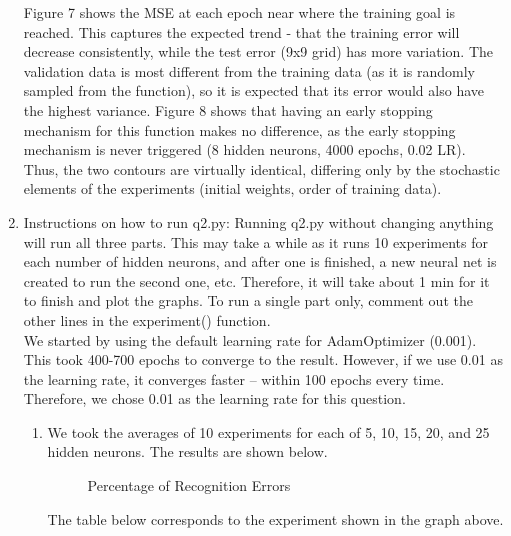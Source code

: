 \documentclass[11pt]{article}
\begin{document}
\begin{enumerate}
Figure 7 shows the MSE at each epoch near where the training goal is reached. This captures the expected trend - that the training error will decrease consistently, while the test error (9x9 grid) has more variation. The validation data is most different from the training data (as it is randomly sampled from the function), so it is expected that its error would also have the highest variance.\newline
\newline
Figure 8 shows that having an early stopping mechanism for this function makes no difference, as the early stopping mechanism is never triggered (8 hidden neurons, 4000 epochs, 0.02 LR). Thus, the two contours are virtually identical, differing only by the stochastic elements of the experiments (initial weights, order of training data). 

\pagebreak
\item Instructions on how to run q2.py:\newline
\newline
Running q2.py without changing anything will run all three parts. This may take a while as it runs 10 experiments for each number of hidden neurons, and after one is finished, a new neural net is created to run the second one, etc. Therefore, it will take about 1 min for it to finish and plot the graphs. To run a single part only, comment out the other lines in the experiment() function.\\
We started by using the default learning rate for AdamOptimizer (0.001). This took 400-700 epochs to converge to the result. However, if we use 0.01 as the learning rate, it converges faster -- within 100 epochs every time. Therefore, we chose 0.01 as the learning rate for this question.\\

% 
\begin{enumerate}
\item We took the averages of 10 experiments for each of 5, 10, 15, 20, and 25 hidden neurons. The results are shown below.\newline

\begin{figure}[h!]
    \centering
        \caption{Percentage of Recognition Errors}
\end{figure}

The table below corresponds to the experiment shown in the graph above.\newline
%


\end{enumerate}
\end{enumerate}
\end{document}
